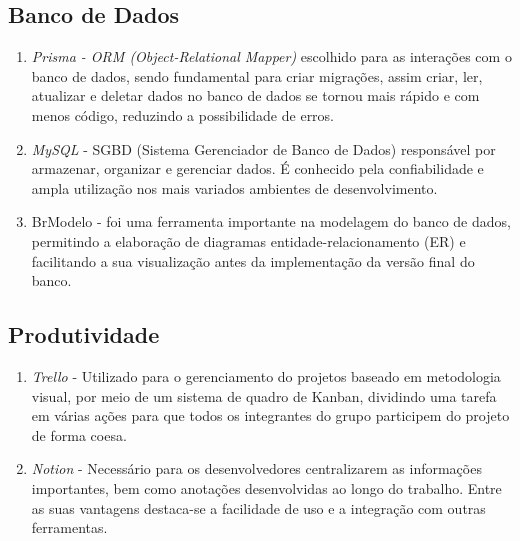 \subsection{Banco de Dados}

\begin{enumerate}

	\item \textit{Prisma - ORM (Object-Relational Mapper)} escolhido para as interações com o banco de dados, sendo fundamental para criar migrações, assim criar, ler, atualizar e deletar dados no banco de dados se tornou mais rápido e com menos código, reduzindo a possibilidade de erros.
	
	\item  \textit{MySQL} - SGBD (Sistema Gerenciador de Banco de Dados) responsável por armazenar, organizar e gerenciar dados. É conhecido pela confiabilidade e ampla utilização nos mais variados ambientes de desenvolvimento.
	
	\item BrModelo -  foi uma ferramenta importante na modelagem do banco de dados, permitindo a elaboração de diagramas entidade-relacionamento (ER) e facilitando a sua visualização antes da implementação da versão final do banco.
	
\end{enumerate}

\subsection{Produtividade}

\begin{enumerate}
	
	\item \textit{Trello} - Utilizado para o gerenciamento do projetos baseado em metodologia visual, por meio de um sistema de quadro de Kanban, dividindo uma tarefa em várias ações para que todos os integrantes do grupo participem do projeto de forma coesa.
	
	\item \textit{ Notion} -  Necessário para os desenvolvedores centralizarem as informações importantes, bem como anotações desenvolvidas ao longo do trabalho. Entre as suas vantagens destaca-se a facilidade de uso e a integração com outras ferramentas.
	
\end{enumerate}

